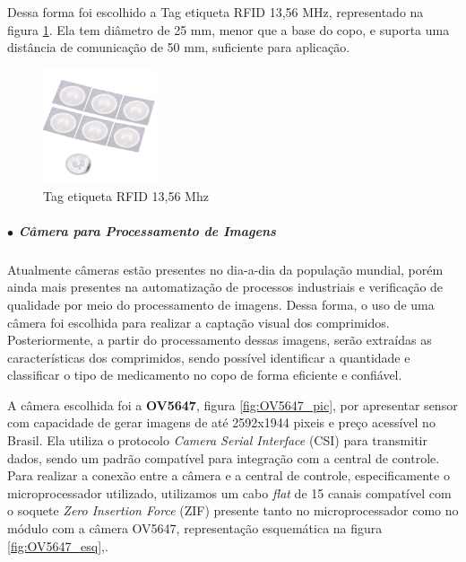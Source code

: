   Dessa forma foi escolhido a Tag etiqueta RFID 13,56 MHz, representado na figura \ref{fig:etiqueta_rfid}. Ela tem diâmetro de 25 mm, menor que a base do copo, e suporta uma distância de comunicação de 50 mm, suficiente para aplicação.

    \begin{figure}[H]
        \centering
        \includegraphics[width=0.3\textwidth]{figuras/etiqueta_rfid.jpg}
        \caption{Tag etiqueta RFID 13,56 Mhz}
        \label{fig:etiqueta_rfid}
     \end{figure}
   
    \subparagraph*{$\bullet$ Câmera para Processamento de Imagens} \hfill
    
    Atualmente câmeras estão presentes no dia-a-dia da população mundial, porém ainda mais presentes na automatização de processos industriais e verificação de qualidade por meio do processamento de imagens. Dessa forma, o uso de uma câmera foi escolhida para realizar a captação visual dos comprimidos. Posteriormente, a partir do  processamento dessas imagens, serão extraídas as características dos comprimidos, sendo possível identificar a quantidade e classificar o tipo de medicamento no copo de forma eficiente e confiável.
    
    A câmera escolhida foi a \textbf{OV5647}, figura \ref{fig:OV5647_pic}, por apresentar sensor com capacidade de gerar imagens de até 2592x1944 pixeis e preço acessível no Brasil. Ela utiliza o protocolo \textit{Camera Serial Interface} (CSI) para transmitir dados, sendo um padrão compatível para integração com a central de controle. Para realizar a conexão entre a câmera e a central de controle, especificamente o microprocessador utilizado, utilizamos um cabo \textit{flat} de 15 canais compatível com o soquete \textit{Zero Insertion Force} (ZIF) presente tanto no microprocessador como no módulo com a câmera OV5647, representação esquemática na figura \ref{fig:OV5647_esq},.
    
